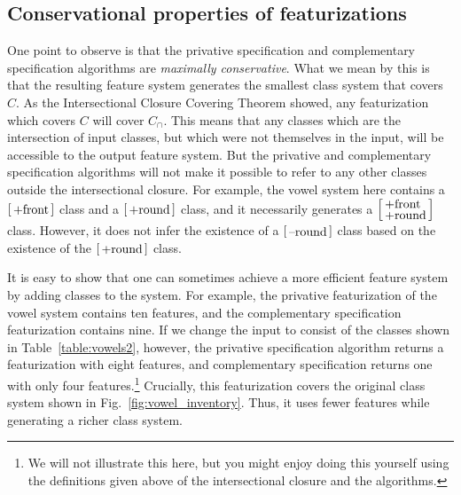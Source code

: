 \documentclass[12pt, oneside]{article}   	%
\newcommand{\featmat}[1]
{$\begin{bsmallmatrix*}[l]\text{\normalsize #1}\end{bsmallmatrix*}$}
\newcommand{\featmattwo}[2]{$\begin{bsmallmatrix*}[l]\text{\normalsize #1}\\\text{\normalsize #2}\end{bsmallmatrix*}$}
\begin{document}
\subsection{Conservational properties of featurizations}

One point to observe is that the privative specification and complementary specification algorithms are \textit{maximally conservative}. What we mean by this is that the resulting feature system generates the smallest class system that covers $C$. As the Intersectional Closure Covering Theorem showed, any featurization which covers $C$ will cover $C_\cap$. This means that any classes which are the intersection of input classes, but which were not themselves in the input, will be accessible to the output feature system. But the privative and complementary specification algorithms will not make it possible to refer to any other classes outside the intersectional closure. For example, the vowel system here contains a \featmat{+front} class and a \featmat{+round} class, and it necessarily generates a \featmattwo{+front}{+round} class. However, it does not infer the existence of a \featmat{--round} class based on the existence of the \featmat{+round} class.

It is easy to show that one can sometimes achieve a more efficient feature system by adding classes to the system. For example, the privative featurization of the vowel system contains ten features, and the complementary specification featurization contains nine. If we change the input to consist of the classes shown in Table~\ref{table:vowels2}, however, the privative specification algorithm returns a featurization with eight features, and complementary specification returns one with only four features.\footnote{We will not illustrate this here, but you might enjoy doing this yourself using the definitions given above of the intersectional closure and the algorithms.} Crucially, this featurization covers the original class system shown in Fig.~\ref{fig:vowel_inventory}. Thus, it uses fewer features while generating a richer class system.
\end{document}
